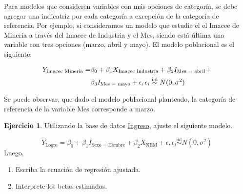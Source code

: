 \documentclass[
  11pt,
]{book}
\providecommand{\tightlist}{%
  \setlength{\itemsep}{0pt}\setlength{\parskip}{0pt}}
\theoremstyle{definition}
\theoremstyle{definition}
\theoremstyle{definition}
\newtheorem{exercise}{Ejercicio}[chapter]
\theoremstyle{definition}
\theoremstyle{remark}
\begin{document}
Para modelos que consideren variables con más opciones de categoría, se debe agregar una indicatriz por cada categoría a excepción de la categoría de referencia. Por ejemplo, si consideramos un modelo que estudie el el Imacec de Minería a través del Imacec de Industria y el Mes, siendo está última una variable con tres opciones (marzo, abril y mayo). El modelo poblacional es el siguiente:

\begin{equation}
\notag
\begin{split}
Y_{\text{Imacec Minería}} = &\beta_0 + \beta_1X_{\text{Imacec Industria}} + \beta_2I_{\text{Mes = abril}} + \\
&\beta_3I_{\text{Mes = mayo}} + \epsilon, \epsilon_i \overset{\text{iid}}{\sim} N(0,\sigma^2)\\
\end{split}
\end{equation}

Se puede observar, que dado el modelo poblacional planteado, la categoría de referencia de la variable Mes corresponde a marzo.

\begin{exercise}

Utilizando la base de datos \hyperref[Ingreso]{Ingreso}, ajuste el siguiente modelo.

\[
Y_{\text{Logro}} = \beta_0 + \beta_1I_{\text{Sexo = Hombre}} + \beta_2X_{\text{NEM}} + \epsilon, \epsilon_i \overset{\text{iid}}{\sim} N(0,\sigma^2)
\]
Luego,

\begin{enumerate}
\def\labelenumi{\arabic{enumi}.}
\tightlist
\item
  Escriba la ecuación de regresión ajustada.
\item
  Interprete los betas estimados.
\end{enumerate}

\end{exercise}
\end{document}
